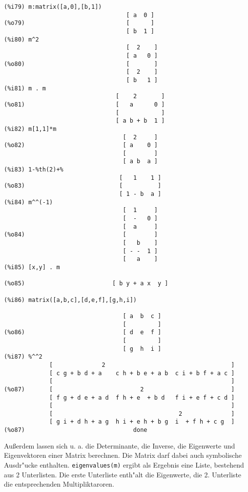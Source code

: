 \documentclass[spanish,12pt,a4paper]{article}
\begin{document}
\scriptsize
\begin{verbatim}
(%i79) m:matrix([a,0],[b,1])
                                   [ a  0 ]
(%o79)                             [      ]
                                   [ b  1 ]
(%i80) m^2
                                   [  2    ]
                                   [ a   0 ]
(%o80)                             [       ]
                                   [  2    ]
                                   [ b   1 ]
(%i81) m . m
                                [    2       ]
(%o81)                          [   a      0 ]
                                [            ]
                                [ a b + b  1 ]
(%i82) m[1,1]*m
                                  [  2     ]
(%o82)                            [ a    0 ]
                                  [        ]
                                  [ a b  a ]
(%i83) 1-%th(2)+%
                                 [   1    1 ]
(%o83)                           [          ]
                                 [ 1 - b  a ]
(%i84) m^^(-1)
                                  [  1     ]
                                  [  -   0 ]
                                  [  a     ]
(%o84)                            [        ]
                                  [   b    ]
                                  [ - -  1 ]
                                  [   a    ]
(%i85) [x,y] . m

(%o85)                         [ b y + a x  y ]

(%i86) matrix([a,b,c],[d,e,f],[g,h,i])

                                  [ a  b  c ]
                                  [         ]
(%o86)                            [ d  e  f ]
                                  [         ]
                                  [ g  h  i ]
(%i87) %^^2
             [              2                                    ]
             [ c g + b d + a    c h + b e + a b  c i + b f + a c ]
             [                                                   ]
(%o87)       [                         2                         ]
             [ f g + d e + a d  f h + e  + b d   f i + e f + c d ]
             [                                                   ]
             [                                    2              ]
             [ g i + d h + a g  h i + e h + b g  i  + f h + c g  ]
(%o87)                               done
\end{verbatim}
\normalsize

Außerdem lassen sich u. a. die Determinante, die Inverse, die Eigenwerte und Eigenvektoren einer Matrix berechnen. Die Matrix darf dabei auch symbolische Ausdr"ucke enthalten.
\verb|eigenvalues(m)| ergibt als Ergebnis eine Liste, bestehend aus 2 Unterlisten. Die erste Unterliste enth"alt die Eigenwerte, die 2. Unterliste die entsprechenden Multipliktaroren.
\end{document}
